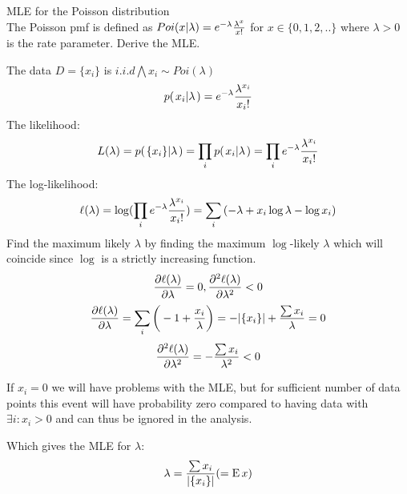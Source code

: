 \documentclass[a4paper,twoside=false,abstract=false,numbers=noenddot,
titlepage=false,headings=small,parskip=half,version=last]{scrartcl}
\begin{document}
\begin{exercise}{3.6} MLE for the Poisson distribution \\
    The Poisson pmf is defined as
    $Poi(x|\lambda)=e^{-{\lambda}}\frac{{\lambda}^{x}}{{x}!}$ for $x \in \{0,1,2,..\}$
    where $\lambda>0$ is the rate parameter. Derive the MLE. 
\end{exercise}
\begin{solution}
    The data $D = \{x_i\}$ is $i.i.d \bigwedge x_i\sim Poi(\lambda)$
    \begin{equation}
        p{(\left. x_i \middle\vert \lambda \right.)} = e^{-{\lambda}}\frac{{\lambda}^{x_i}}{{x_i}!}
    \end{equation}
    The likelihood:
    \begin{equation}
        L(\lambda)=p{(\left. \{x_i\} \middle\vert \lambda \right.)}=\prod\limits_i{p{(\left. x_i \middle\vert \lambda \right.)}}=\prod\limits_i e^{-{\lambda}}\frac{{\lambda}^{x_i}}{{x_i}!}
    \end{equation}
    The log-likelihood:
    \begin{equation}
        \ell(\lambda)=\log(\prod\limits_ie^{-{\lambda}}\frac{{\lambda}^{x_i}}{{x_i}!})=
        \sum\limits_i{(-\lambda+x_i \log\lambda-\log x_i)}
    \end{equation}
    Find the maximum likely $\lambda$ by finding the maximum $\log$-likely
    $\lambda$ which will coincide since $\log$ is a strictly increasing
    function.
    \begin{equation}
        \frac{\partial{\ell(\lambda)}}{\partial{\lambda}} = 0,
        \frac{\partial^2{\ell(\lambda)}}{\partial{\lambda}^2} < 0
    \end{equation}
    \begin{equation}
        \frac{\partial{\ell(\lambda)}}{\partial{\lambda}} =
        \sum\limits_i{\bigg(-1+\frac{x_i}{\lambda}\bigg)}=-|\{x_i\}|+\frac{\sum{x_i}}{\lambda}=0
    \end{equation}
    \begin{equation}
        \frac{\partial^2{\ell(\lambda)}}{\partial{\lambda}^2} = 
        -\frac{\sum{x_i}}{\lambda^2} < 0
    \end{equation}
    \begin{remark}
        If $x_i=0$ we will have problems with the MLE, but for sufficient 
        number of data points this event will have probability zero compared to
        having data with $\exists i:x_i>0$ and can thus be ignored in the
        analysis.
    \end{remark}
    Which gives the MLE for $\lambda$:
    \begin{equation}
        \lambda=\frac{\sum{x_i}}{|\{x_i\}|}(={\rm E}\, x)
    \end{equation}
\end{solution}
\end{document}
